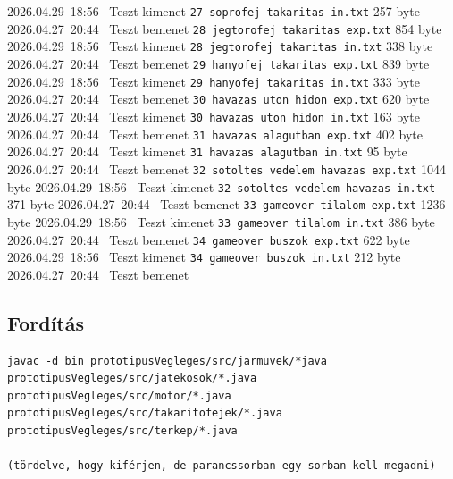 \begin{fajllista}
    {2026.04.29~18:56~} %
    {Teszt kimenet} %
    \fajl
    {\texttt{27 soprofej takaritas in.txt}} %
    {257 byte} %
    {2026.04.27~20:44~} %
    {Teszt bemenet} %
    \fajl
    {\texttt{28 jegtorofej takaritas exp.txt}} %
    {854 byte} %
    {2026.04.29~18:56~} %
    {Teszt kimenet} %
    \fajl
    {\texttt{28 jegtorofej takaritas in.txt}} %
    {338 byte} %
    {2026.04.27~20:44~} %
    {Teszt bemenet} %
    \fajl
    {\texttt{29 hanyofej takaritas exp.txt}} %
    {839 byte} %
    {2026.04.29~18:56~} %
    {Teszt kimenet} %
    \fajl
    {\texttt{29 hanyofej takaritas in.txt}} %
    {333 byte} %
    {2026.04.27~20:44~} %
    {Teszt bemenet} %
    \fajl
    {\texttt{30 havazas uton hidon exp.txt}} %
    {620 byte} %
    {2026.04.27~20:44~} %
    {Teszt kimenet} %
    \fajl
    {\texttt{30 havazas uton hidon in.txt}} %
    {163 byte} %
    {2026.04.27~20:44~} %
    {Teszt bemenet} %
    \fajl
    {\texttt{31 havazas alagutban exp.txt}} %
    {402 byte} %
    {2026.04.27~20:44~} %
    {Teszt kimenet} %
    \fajl
    {\texttt{31 havazas alagutban in.txt}} %
    {95 byte} %
    {2026.04.27~20:44~} %
    {Teszt bemenet} %
    \fajl
    {\texttt{32 sotoltes vedelem havazas exp.txt}} %
    {1044 byte} %
    {2026.04.29~18:56~} %
    {Teszt kimenet} %
    \fajl
    {\texttt{32 sotoltes vedelem havazas in.txt}} %
    {371 byte} %
    {2026.04.27~20:44~} %
    {Teszt bemenet} %
    \fajl
    {\texttt{33 gameover tilalom exp.txt}} %
    {1236 byte} %
    {2026.04.29~18:56~} %
    {Teszt kimenet} %
    \fajl
    {\texttt{33 gameover tilalom in.txt}} %
    {386 byte} %
    {2026.04.27~20:44~} %
    {Teszt bemenet} %
    \fajl
    {\texttt{34 gameover buszok exp.txt}} %
    {622 byte} %
    {2026.04.29~18:56~} %
    {Teszt kimenet} %
    \fajl
    {\texttt{34 gameover buszok in.txt}} %
    {212 byte} %
    {2026.04.27~20:44~} %
    {Teszt bemenet} %
\end{fajllista}

\subsection{Fordítás}
\begin{verbatim}
javac -d bin prototipusVegleges/src/jarmuvek/*java 
prototipusVegleges/src/jatekosok/*.java 
prototipusVegleges/src/motor/*.java
prototipusVegleges/src/takaritofejek/*.java 
prototipusVegleges/src/terkep/*.java 

(tördelve, hogy kiférjen, de parancssorban egy sorban kell megadni)
\end{verbatim}

